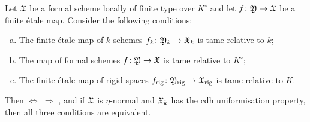 \begin{prop} \label{prop:tameness-comparison-etale}
    Let ${\mathfrak{X}}$ be a formal scheme locally of finite type over $K^\circ$ and let $f \colon {\mathfrak{Y}}\to {\mathfrak{X}}$ be a finite \'etale map.
    Consider the following conditions:
    \begin{enumerate}[(a)]
        \item \label{propitem:tameness-comparison-etale-a} The finite \'etale map of $k$-schemes $f_k \colon {\mathfrak{Y}}_k\to{\mathfrak{X}}_k$ is tame relative to $k$;
        \item \label{propitem:tameness-comparison-etale-b}The map of formal schemes $f \colon {\mathfrak{Y}}\to{\mathfrak{X}}$ is tame relative to $K^\circ$;
        \item \label{propitem:tameness-comparison-etale-c} The finite \'etale map of rigid spaces $f_{\rm rig} \colon {\mathfrak{Y}}_{\rm rig}\to{\mathfrak{X}}_{\rm rig}$ is tame relative to $K$.
    \end{enumerate}
    Then  $\Leftrightarrow$  $\Rightarrow$ , and if ${\mathfrak{X}}$ is $\eta$-normal and ${\mathfrak{X}}_k$ has the cdh uniformisation property, then all three conditions are equivalent.
\end{prop}

